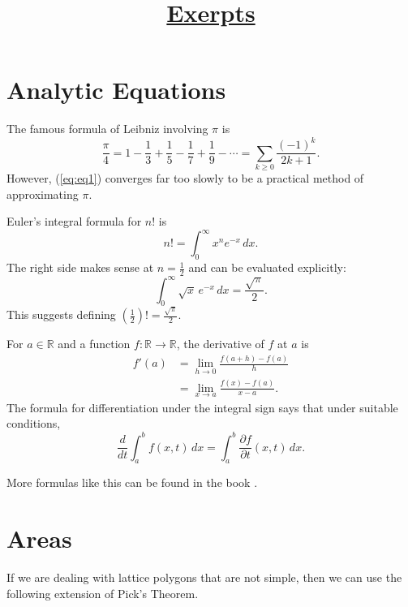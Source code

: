 \documentclass[12pt]{article}
\title{\underline{Exerpts}}
\author{}
\date{}
\begin{document}
	\maketitle
	\section{Analytic Equations}
	The famous formula of Leibniz involving $\pi$ is
	\begin{equation}\label{eq:eq1}
		\frac{\pi}{4}=1-\frac{1}{3}+\frac{1}{5}-\frac{1}{7}+\frac{1}{9}-\cdots=\sum_{k\geq0}\frac{(-1)^k}{2k+1}.
	\end{equation}
	However, (\ref{eq:eq1}) converges far too slowly to be a practical method of approximating $\pi$.
	
	Euler’s integral formula for $n!$ is
	\begin{equation*}\label{eq:eq2}
		n! = \int_{0}^{\infty} x^n e^{-x}\, dx.
	\end{equation*}
	The right side makes sense at $n = \tfrac{1}{2}$ and can be evaluated explicitly:
	\begin{equation*}\label{eq:eq3}
		\int_{0}^{\infty} \sqrt{x}\, e^{-x}\, dx = \frac{\sqrt{\pi}}{2}.
	\end{equation*}
	This suggests defining
	$(\frac{1}{2})! = \frac{\sqrt{\pi}}{2}.$
	
	For $a \in \mathbb{R}$ and a function $f:\mathbb{R} \to \mathbb{R}$, 
	the derivative of $f$ at $a$ is
	\begin{align*}\label{eq:eq4}
		f'(a) &= \lim_{h \to 0} \frac{f(a+h) - f(a)}{h} \\
		& = \lim_{x \to a} \frac{f(x)-f(a)}{x-a}.
	\end{align*}
	The formula for differentiation under the integral sign says that under suitable conditions,
	\begin{equation*}\label{eq:eq5}
		\frac{d}{dt} \int_a^b f(x,t)\, dx = \int_a^b \frac{\partial f}{\partial t}(x,t)\, dx.
	\end{equation*}
	
	More formulas like this can be found in the book \textcolor{red}{\cite{rubin1976}}.
	
	\section{Areas}
	
	If we are dealing with lattice polygons that are not simple, then we can use the following extension of Pick’s Theorem.
	
\end{document}
